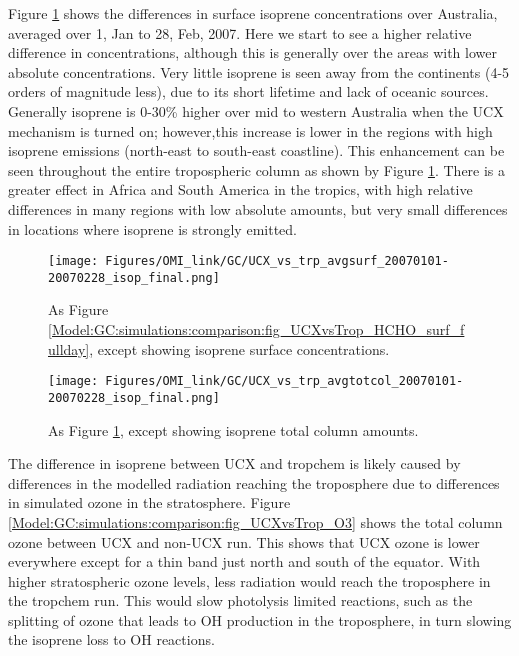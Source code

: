 Figure \ref{Model:GC:simulations:comparison:fig_UCXvsTrop_isop_surf_fullday} shows the differences in surface isoprene concentrations over Australia, averaged over 1, Jan to 28, Feb, 2007.
Here we start to see a higher relative difference in concentrations, although this is generally over the areas with lower absolute concentrations. 
Very little isoprene is seen away from the continents (4-5 orders of magnitude less), due to its short lifetime and  lack of oceanic sources.
Generally isoprene is 0-30\% higher over mid to western Australia when the UCX mechanism is turned on; however,this increase is lower in the regions with high isoprene emissions (north-east to south-east coastline).
This enhancement can be seen throughout the entire tropospheric column as shown by Figure \ref{Model:GC:simulations:comparison:fig_UCXvsTrop_isop_surf_fullday}.
There is a greater effect in Africa and South America in the tropics, with high relative differences in many regions with low absolute amounts, but very small differences in locations where isoprene is strongly emitted.

\begin{figure}
  \texttt{[image: Figures/OMI\_link/GC/UCX\_vs\_trp\_avgsurf\_20070101-20070228\_isop\_final.png]}
  \caption{ %
    As Figure \ref{Model:GC:simulations:comparison:fig_UCXvsTrop_HCHO_surf_fullday}, except showing isoprene surface concentrations. 
  }      
  \label{Model:GC:simulations:comparison:fig_UCXvsTrop_isop_surf_fullday}
\end{figure}
\begin{figure}
  \texttt{[image: Figures/OMI\_link/GC/UCX\_vs\_trp\_avgtotcol\_20070101-20070228\_isop\_final.png]}
  \caption{ %
    As Figure \ref{Model:GC:simulations:comparison:fig_UCXvsTrop_isop_surf_fullday}, except showing isoprene total column amounts. 
  }      
  \label{Model:GC:simulations:comparison:fig_UCXvsTrop_isop_totcol_fullday}
\end{figure}


The difference in isoprene between UCX and tropchem is likely caused by differences in the modelled radiation reaching the troposphere due to differences in simulated ozone in the stratosphere.
Figure \ref{Model:GC:simulations:comparison:fig_UCXvsTrop_O3} shows the total column ozone between UCX and non-UCX run.
This shows that UCX ozone is lower everywhere except for a thin band just north and south of the equator.
With higher stratospheric ozone levels, less radiation would reach the troposphere in the tropchem run.
This would slow photolysis limited reactions, such as the splitting of ozone that leads to OH production in the troposphere, in turn slowing the isoprene loss to OH reactions.

